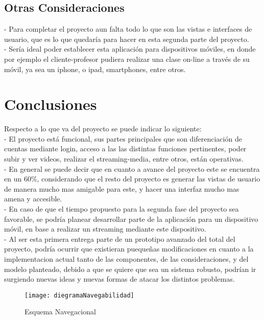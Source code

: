 \documentclass[12pt]{article}
\begin{document}
\subsection{Otras Consideraciones}
-	Para completar el proyecto aun falta todo lo que son las vistas e interfaces de usuario, que es lo que quedaría 
para hacer en esta segunda parte del proyecto.\\

-	Sería ideal poder establecer esta aplicación para dispositivos móviles, en donde por ejemplo el 
cliente-profesor pudiera realizar una clase on-line a través de su móvil, ya sea un iphone, o ipad, smartphones, entre otros.\\


\newpage
\section{Conclusiones\\}
Respecto a lo que va del proyecto se puede indicar lo siguiente:\\
-	El proyecto está funcional, sus partes principales que son diferenciación de cuentas 
mediante login, acceso a las las distintas funciones pertinentes, poder subir y ver videos, realizar
el streaming-media, entre otros, están operativas.\\

-	En general se puede decir que en cuanto a avance del proyecto este se encuentra en un 60\%, 
considerando que el resto del proyecto es generar las vistas de usuario de manera mucho mas amigable 
para este, y hacer una interfaz mucho mas amena y accesible.\\

-	En caso de que el tiempo propuesto para la segunda fase del proyecto sea favorable, se podría 
planear desarrollar parte de la aplicación para un dispositivo móvil, en base a realizar un streaming 
mediante este dispositivo.\\

-	Al ser esta primera entrega parte de un prototipo avanzado del total del proyecto, podría ocurrir
que existieran pueque\~nas modificaciones en cuanto a la implementacion actual tanto de las 
componentes, de las consideraciones, y del modelo planteado, debido a que se quiere que sea un
sistema robusto, podrían ir surgiendo nuevas ideas y nuevas formas de atacar los distintos problemas.\\



\newpage

%
\newpage
\begin{figure}
  \centering
      \texttt{[image: diegramaNavegabilidad]}
	    \caption{Esquema Navegacional}
	\label{fig:diagrama_Navegabilidad}
\end{figure}
\end{document}
